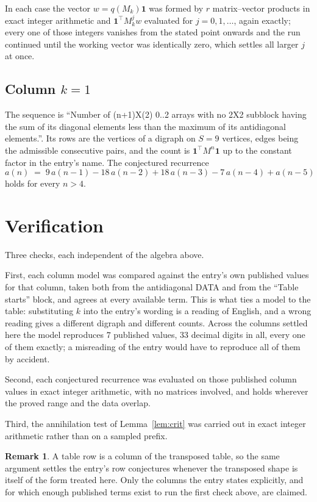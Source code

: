 \documentclass[11pt,a4paper]{article}
\theoremstyle{plain}
\theoremstyle{definition}
\newtheorem{remark}[theorem]{Remark}
\begin{document}
In each case the vector $w=q(M_k)\mathbf{1}$ was formed by $r$ matrix--vector products in
exact integer arithmetic and $\mathbf{1}^{\!\top}M_k^{j}w$ evaluated for $j=0,1,\dots$,
again exactly; every one of those integers vanishes from the stated point onwards and the run
continued until the working vector was identically zero, which settles all larger $j$ at once.

\subsection*{Column $k=1$}
The sequence is ``Number of (n+1)X(2) 0..2 arrays with no 2X2 subblock having the sum of its diagonal elements less than the maximum of its antidiagonal elements.''. Its rows are the vertices of a digraph on
$S=9$ vertices, edges being the admissible consecutive pairs, and the count is
$\mathbf{1}^{\!\top}M^{n}\mathbf{1}$ up to the constant factor in the entry's name.
The conjectured recurrence
\[
a(n)\;=\;9\,a(n-1) - 18\,a(n-2) + 18\,a(n-3) - 7\,a(n-4) + a(n-5)
\]
holds for every $n>4$.

\section{Verification}

Three checks, each independent of the algebra above.

First, each column model was compared against the entry's own published values for that
column, taken both from the antidiagonal DATA and from the ``Table starts'' block, and agrees
at every available term. This is what ties a model to the table: substituting $k$ into the
entry's wording is a reading of English, and a wrong reading gives a different digraph and
different counts. Across the columns settled here the model reproduces $7$ published
values, $33$ decimal digits in all, every one of them exactly; a misreading of the entry
would have to reproduce all of them by accident.

Second, each conjectured recurrence was evaluated on those published column values in exact
integer arithmetic, with no matrices involved, and holds wherever the proved range and the
data overlap.

Third, the annihilation test of Lemma~\ref{lem:crit} was carried out in exact integer
arithmetic rather than on a sampled prefix.

\begin{remark}
A table row is a column of the transposed table, so the same argument settles the entry's row
conjectures whenever the transposed shape is itself of the form treated here. Only the columns
the entry states explicitly, and for which enough published terms exist to run the first check
above, are claimed.
\end{remark}
\end{document}
